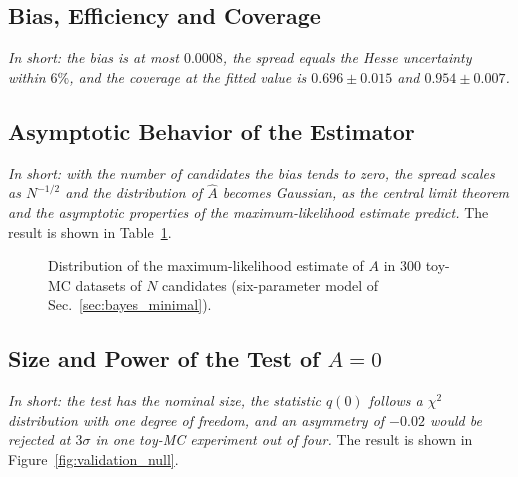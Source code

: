 \subsection{Bias, Efficiency and Coverage}
\label{app:bias_cov}
\emph{In short: the bias is at most $0.0008$, the spread equals the Hesse uncertainty within $6\%$, and the coverage at the fitted value is $0.696\pm0.015$ and $0.954\pm0.007$.}

\subsection{Asymptotic Behavior of the Estimator}
\label{sec:checks_scaling}
\emph{In short: with the number of candidates the bias tends to zero, the spread scales as $N^{-1/2}$ and the distribution of $\hat A$ becomes Gaussian, as the central limit theorem and the asymptotic properties of the maximum-likelihood estimate predict.}
The result is shown in Table~\ref{tab:checks_scaling}.

\begin{figure}[!t]
\makeatletter{}\makeatother
\centering
{}
\caption{Distribution of the maximum-likelihood estimate of $A$ in $300$ toy-MC datasets of $N$ candidates (six-parameter model of Sec.~\ref{sec:bayes_minimal}).}
\label{tab:checks_scaling}
\end{figure}

\subsection{Size and Power of the Test of $A=0$}
\label{sec:validation_power}
\emph{In short: the test has the nominal size, the statistic $q(0)$ follows a $\chi^2$ distribution with one degree of freedom, and an asymmetry of $-0.02$ would be rejected at $3\sigma$ in one toy-MC experiment out of four.}
The result is shown in Figure~\ref{fig:validation_null}.

